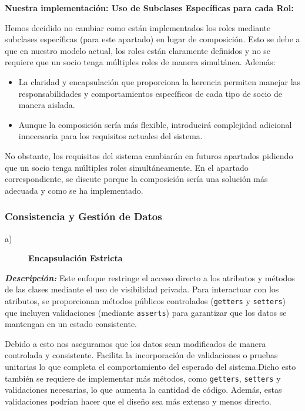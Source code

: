 \textbf{Nuestra implementación: Uso de Subclases Específicas para cada Rol:}\par  
\vspace{0.15cm}
Hemos decidido no cambiar como están implementados los roles mediante subclases específicas 
(para este apartado) en lugar de composición. Esto se debe a que en nuestro modelo actual, 
los roles están claramente definidos y no se requiere que un socio tenga múltiples roles de 
manera simultánea. Además:
\begin{itemize}
    \item La claridad y encapsulación que proporciona la herencia permiten manejar las responsabilidades y comportamientos específicos de cada tipo de socio de manera aislada.
    \item Aunque la composición sería más flexible, introducirá complejidad adicional innecesaria para los requisitos actuales del sistema.
\end{itemize}

No obstante, los requisitos del sistema cambiarán en futuros apartados pidiendo que un socio
tenga múltiples roles simultáneamente. En el apartado correspondiente, se discute porque 
la composición sería una solución más adecuada y como se ha implementado.




\subsubsection{Consistencia y Gestión de Datos}

\begin{description}
    \item[a)] \textbf{Encapsulación Estricta}
\end{description}

\textit{\textbf{Descripción:}}  
Este enfoque restringe el acceso directo a los atributos y métodos de las clases mediante 
el uso de visibilidad privada. Para interactuar con los atributos, se proporcionan métodos 
públicos controlados (\texttt{getters} y \texttt{setters}) que incluyen validaciones (mediante 
\texttt{asserts}) para garantizar que los datos se mantengan en un estado consistente.
\vspace{0.15cm}

    Debido a esto nos aseguramos que los datos sean modificados de manera controlada y consistente.
    Facilita la incorporación de validaciones o pruebas unitarias lo que completa el comportamiento del
    esperado del sistema.Dicho esto también se requiere de implementar más métodos, como \texttt{getters}, \texttt{setters} y validaciones 
    necesarias, lo que aumenta la cantidad de código. Además, estas validaciones podrían hacer 
    que el diseño sea más extenso y menos directo.\par
    \vspace{0.15cm}



